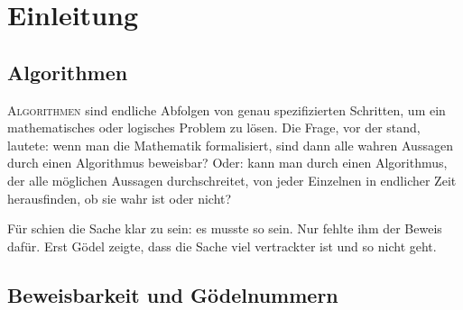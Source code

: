 \section*{Einleitung}

\let\originalthefootnote\thefootnote
\renewcommand*{\thefootnote}{\fnsymbol{footnote}}

\subsection*{Algorithmen}

\lettrine[nindent=0em]{\color{purple}A}{lgorithmen} sind endliche Abfolgen von
genau spezifizierten Schritten, um ein mathematisches oder logisches Problem zu lösen. 
Die Frage, vor der  stand, lautete: wenn man die Mathematik formalisiert, 
sind dann alle wahren Aussagen durch einen Algorithmus beweisbar? Oder: kann man durch
einen Algorithmus, der alle möglichen Aussagen durchschreitet, von jeder Einzelnen
in endlicher Zeit herausfinden, ob sie wahr ist oder nicht?

Für  schien die Sache klar zu sein: es musste so sein. Nur fehlte ihm der Beweis
dafür. Erst Gödel zeigte, dass die Sache viel vertrackter ist und so nicht geht.

\subsection*{Beweisbarkeit und Gödelnummern}

